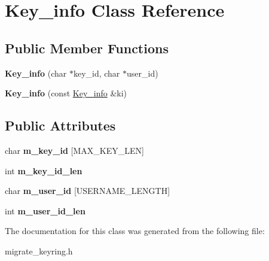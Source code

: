\hypertarget{classKey__info}{}\section{Key\+\_\+info Class Reference}
\label{classKey__info}
\subsection*{Public Member Functions}
\begin{DoxyCompactItemize}
\item 
\mbox{\label{classKey__info_a1a05d90c8c9cd6ec0c48c72443e69d95}} 
{\bfseries Key\+\_\+info} (char $\ast$key\+\_\+id, char $\ast$user\+\_\+id)
\item 
\mbox{\label{classKey__info_ad09643da65d92343dae2810623e47f0e}} 
{\bfseries Key\+\_\+info} (const \mbox{\hyperlink{classKey__info}{Key\+\_\+info}} \&ki)
\end{DoxyCompactItemize}
\subsection*{Public Attributes}
\begin{DoxyCompactItemize}
\item 
\mbox{\label{classKey__info_a383135dea64c5c4d07bd8b289b53e7b0}} 
char {\bfseries m\+\_\+key\+\_\+id} \mbox{[}M\+A\+X\+\_\+\+K\+E\+Y\+\_\+\+L\+EN\mbox{]}
\item 
\mbox{\label{classKey__info_a2c6998de1873f11c57ecffcabc674c37}} 
int {\bfseries m\+\_\+key\+\_\+id\+\_\+len}
\item 
\mbox{\label{classKey__info_a4176bc991dbe33571164414477043ea7}} 
char {\bfseries m\+\_\+user\+\_\+id} \mbox{[}U\+S\+E\+R\+N\+A\+M\+E\+\_\+\+L\+E\+N\+G\+TH\mbox{]}
\item 
\mbox{\label{classKey__info_a90c701c5d4b310a8dded370b5af230bb}} 
int {\bfseries m\+\_\+user\+\_\+id\+\_\+len}
\end{DoxyCompactItemize}


The documentation for this class was generated from the following file\+:\begin{DoxyCompactItemize}
\item 
migrate\+\_\+keyring.\+h\end{DoxyCompactItemize}
